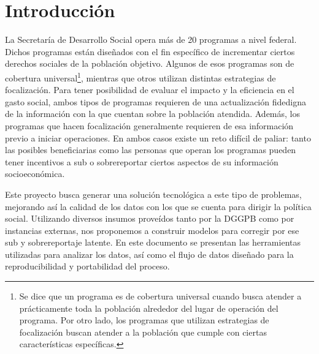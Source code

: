 \chapter{Introducción}
La Secretaría de Desarrollo Social opera más de 20 programas a nivel federal. Dichos programas están diseñados con el fin específico de incrementar ciertos derechos sociales de la población objetivo. Algunos de esos programas son de cobertura universal\footnote{Se dice que un programa es de cobertura universal cuando busca atender a prácticamente toda la población alrededor del lugar de operación del programa. Por otro lado, los programas que utilizan estrategias de focalización buscan atender a la población que cumple con ciertas características específicas.}, mientras que otros utilizan distintas estrategias de focalización. Para tener posibilidad de evaluar el impacto y la eficiencia en el gasto social, ambos tipos de programas requieren de una actualización fidedigna de la información con la que cuentan sobre la población atendida. Además, los programas que hacen focalización generalmente requieren de esa información previo a iniciar operaciones. En ambos casos existe un reto difícil de paliar: tanto las posibles beneficiarias como las personas que operan los programas pueden tener incentivos a sub o sobrereportar ciertos aspectos de su información socioeconómica.
\par
\noindent
Este proyecto busca generar una solución tecnológica a este tipo de problemas, mejorando así la calidad de los datos con los que se cuenta para dirigir la política social. Utilizando diversos insumos proveídos tanto por la DGGPB como por instancias externas, nos proponemos a construir modelos para corregir por ese sub y sobrereportaje latente. En este documento se presentan las herramientas utilizadas para analizar los datos, así como el flujo de datos diseñado para la reproducibilidad y portabilidad del proceso.
